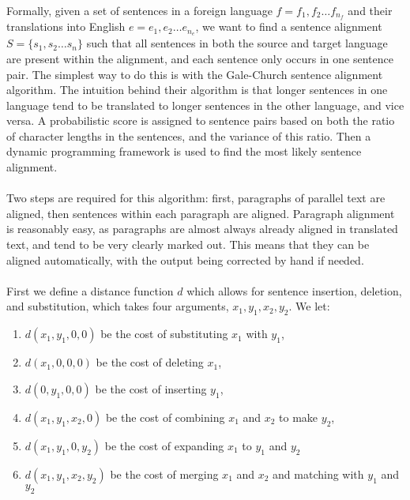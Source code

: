 \paragraph{}{Formally, \cite{smt} given a set of sentences in a
  foreign language $f = f_1, f_2 \dots f_{n_{f}}$ and their
  translations into English $e = e_1, e_2 \dots e_{n_{e}}$, we want to
  find a sentence alignment $S = \{ s_1, s_2 \dots s_n\}$ such that
  all sentences in both the source and target language are present
  within the alignment, and each sentence only occurs in one sentence
  pair. The simplest way to do this is with the Gale-Church sentence
  alignment algorithm. \cite{gale} The intuition behind their
  algorithm is that longer sentences in one language tend to be
  translated to longer sentences in the other language, and
  vice versa. A probabilistic score is assigned to sentence pairs
  based on both the ratio of character lengths in the sentences, and
  the variance of this ratio. Then a dynamic programming framework is
  used to find the most likely sentence alignment.}
\paragraph{}{Two steps are required for this algorithm: first,
  paragraphs of parallel text are aligned, then sentences within each
  paragraph are aligned. Paragraph alignment is reasonably easy, as
  paragraphs are almost always already aligned in translated text, and
  tend to be very clearly marked out. This means that they can be
  aligned automatically, with the output being corrected by hand if
  needed.}

\paragraph{}{First we define a distance function $d$ which allows for
  sentence insertion, deletion, and substitution, which takes four
  arguments, $x_1, y_1, x_2, y_2$. We let:\cite{gale}}
\begin{enumerate}
\item $d(x_1, y_1, 0, 0)$ be the cost of substituting $x_1$ with
  $y_1$,
\item $d(x_1, 0, 0, 0)$ be the cost of deleting $x_1$,
\item $d(0, y_1, 0, 0)$ be the cost of inserting $y_1$,
\item $d(x_1, y_1, x_2, 0)$ be the cost of combining $x_1$ and $x_2$
  to make $y_2$,
\item $d(x_1, y_1, 0, y_2)$ be the cost of expanding $x_1$ to $y_1$
  and $y_2$
\item $d(x_1, y_1, x_2, y_2)$ be the cost of merging $x_1$ and $x_2$
  and matching with $y_1$ and $y_2$
\end{enumerate}

